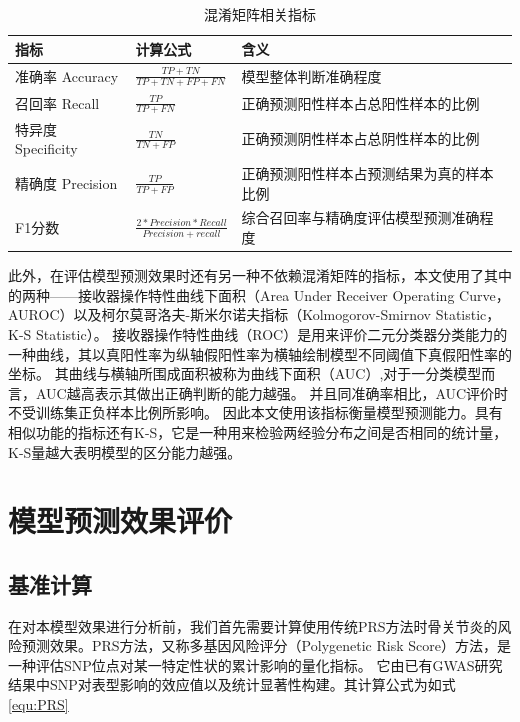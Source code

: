 \begin{table}[!h]
	\renewcommand{\arraystretch}{1.2}
	\centering\wuhao
	\caption{混淆矩阵相关指标} \label{tab:ConfusionMatrixFactor} \vspace{2mm}
	\begin{tabularx}{\textwidth} { 
   >{\centering\arraybackslash}X 
   >{\centering\arraybackslash}X
   >{\centering\arraybackslash}X}
	\toprule[1.5pt]
		指标 & 计算公式 & 含义 \\
	\midrule[1pt]
		准确率 Accuracy & $\frac{TP+TN}{TP+TN+FP+FN}$ & 模型整体判断准确程度 \\
        召回率 Recall & $\frac{TP}{TP+FN}$ &
        正确预测阳性样本占总阳性样本的比例 \\
        特异度 Specificity & $\frac{TN}{TN+FP}$ &
        正确预测阴性样本占总阴性样本的比例 \\
        精确度 Precision & $\frac{TP}{TP+FP}$ &
        正确预测阳性样本占预测结果为真的样本比例 \\
        F1分数 & $\frac{2*Precision*Recall}{Precision+recall}$ &
        综合召回率与精确度评估模型预测准确程度 \\
	\bottomrule[1.5pt]
	\end{tabularx}
\end{table}
此外，在评估模型预测效果时还有另一种不依赖混淆矩阵的指标，本文使用了其中的两种——接收器操作特性曲线下面积（Area Under Receiver Operating Curve，AUROC）以及柯尔莫哥洛夫-斯米尔诺夫指标（Kolmogorov-Smirnov Statistic，K-S Statistic）。
接收器操作特性曲线（ROC）是用来评价二元分类器分类能力的一种曲线，其以真阳性率为纵轴假阳性率为横轴绘制模型不同阈值下真假阳性率的坐标。
其曲线与横轴所围成面积被称为曲线下面积（AUC）,对于一分类模型而言，AUC越高表示其做出正确判断的能力越强。\cite{fawcett_introduction_2006}
并且同准确率相比，AUC评价时不受训练集正负样本比例所影响。\cite{zou_receiver-operating_2007}
因此本文使用该指标衡量模型预测能力。具有相似功能的指标还有K-S\cite{naaman_tight_2021}，它是一种用来检验两经验分布之间是否相同的统计量，K-S量越大表明模型的区分能力越强。
\section{模型预测效果评价}
\subsection{基准计算}

在对本模型效果进行分析前，我们首先需要计算使用传统PRS方法时骨关节炎的风险预测效果。PRS方法，又称多基因风险评分（Polygenetic Risk Score）方法\cite{dudbridge_power_2013}，是一种评估SNP位点对某一特定性状的累计影响的量化指标。
它由已有GWAS研究结果中SNP对表型影响的效应值以及统计显著性构建。其计算公式为如式\ref{equ:PRS}

